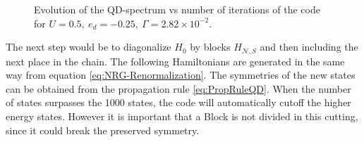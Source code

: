 \begin{figure}[t]
	\caption{\label{Fig-Dot-Spectrum} Evolution of the QD-spectrum vs number of
	iterations of the code for $U=0.5,\ e_{d}=-0.25,\ \Gamma=2.82\times10^{-2}.$ }
\end{figure}

The next step would be to diagonalize $H_{0}$ by blocks $H_{\mathcal{N},S}$ and then including the next place in the chain. The following Hamiltonians are generated in the same way from equation \ref{eq:NRG-Renormalization}. The symmetries of the new states can be obtained from the propagation rule \ref{eq:PropRuleQD}. When the number of states surpasses the 1000 states, the code will automatically cutoff the higher energy states. However it is important that a Block is not divided in this cutting, since it could break the preserved symmetry. 

